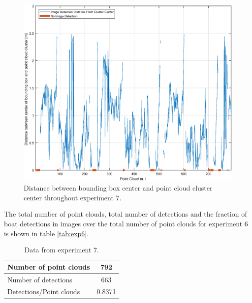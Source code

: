 \begin{figure}[H]
	\centering
	\includegraphics[width=.7\linewidth]{fig/exp_7_dist_pr_pc.eps}
	\caption{Distance between bounding box center and point cloud cluster center throughout experiment 7.}
	\label{fig:ex7_pc_dist}
\end{figure}
The total number of point clouds, total number of detections and the fraction of boat detections in images over the total number of point clouds for experiment 6 is shown in table \ref{tab:exp6}.
\begin{table}[H]
	\centering
	\begin{tabularx}{.7\linewidth}{L c}
		\toprule
		Number of point clouds & 792\\
		\midrule
		Number of detections & 663\\
		\midrule
		Detections/Point clouds & 0.8371 \\
		\bottomrule
	\end{tabularx}
	\caption{Data from experiment 7.}
	\label{tab:exp7}
\end{table}
\cleardoublepage